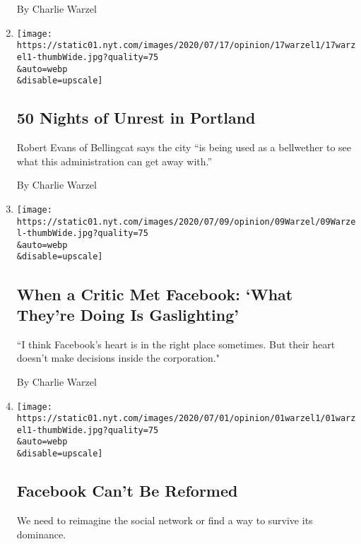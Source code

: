 \begin{enumerate}
  By Charlie Warzel
\item
  \href{/2020/07/17/opinion/portland-protests-federal-agents.html}{}

  \texttt{[image: https://static01.nyt.com/images/2020/07/17/opinion/17warzel1/17warzel1-thumbWide.jpg?quality=75\\\&auto=webp\\\&disable=upscale]}

  \hypertarget{50-nights-of-unrest-in-portland}{%
  \subsection{50 Nights of Unrest in
  Portland}\label{50-nights-of-unrest-in-portland}}

  Robert Evans of Bellingcat says the city ``is being used as a
  bellwether to see what this administration can get away with.''

  By Charlie Warzel
\item
  \href{/2020/07/09/opinion/facebook-civil-rights-robinson.html}{}

  \texttt{[image: https://static01.nyt.com/images/2020/07/09/opinion/09Warzel/09Warzel-thumbWide.jpg?quality=75\\\&auto=webp\\\&disable=upscale]}

  \hypertarget{when-a-critic-met-facebook-what-theyre-doing-is-gaslighting}{%
  \subsection{When a Critic Met Facebook: `What They're Doing Is
  Gaslighting'}\label{when-a-critic-met-facebook-what-theyre-doing-is-gaslighting}}

  ``I think Facebook's heart is in the right place sometimes. But their
  heart doesn't make decisions inside the corporation."

  By Charlie Warzel
\item
  \href{/2020/07/01/opinion/facebook-zuckerberg.html}{}

  \texttt{[image: https://static01.nyt.com/images/2020/07/01/opinion/01warzel1/01warzel1-thumbWide.jpg?quality=75\\\&auto=webp\\\&disable=upscale]}

  \hypertarget{facebook-cant-be-reformed}{%
  \subsection{Facebook Can't Be
  Reformed}\label{facebook-cant-be-reformed}}

  We need to reimagine the social network or find a way to survive its
  dominance.


\end{enumerate}
